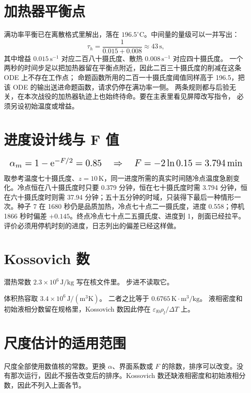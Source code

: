 \section{加热器平衡点}

满功率平衡已在离散格式里解出，落在 \(196.5^\circ\mathrm{C}\)。中间量的量级可以一并写出：
\begin{equation}
\label{eq:heater-tau}
\tau_h=\frac{1}{0.015+0.008}\approx 43\,\mathrm{s},
\end{equation}
其中增益 \(0.015\,\mathrm{s}^{-1}\) 对应二百八十摄氏度、散热 \(0.008\,\mathrm{s}^{-1}\) 对应四十摄氏度。
一个两秒的时间步足以把加热器留在平衡点附近，因此二百三十摄氏度的削减在这条 ODE 上不存在工作点；
命题函数所用的二百一十摄氏度阈值同样高于 196.5，把该 ODE 的输出送进命题函数，请求仍停在满功率一侧。
两条规则都与后验无关，在本次战役的加热器轨迹上也始终待命。要在主表里看见屏障改写指令，
必须另设初始温度或增益。

\section{进度设计线与 F 值}

\[
\resizebox{\columnwidth}{!}{$
\alpha_m=1-\mathrm{e}^{-F/2}=0.85
\quad\Rightarrow\quad
F=-2\ln 0.15=3.794\,\mathrm{min}
$}
\]
取参考温度七十摄氏度、\(z=10\,\mathrm{K}\)，同一进度所需的真实时间随冷点温度急剧变化。冷点恒在八十摄氏度时只要 0.379 分钟，恒在七十摄氏度时需 3.794 分钟，恒在六十摄氏度时则需 37.94 分钟；五十五分钟的时域，只装得下最后一种情形一次。种子 7 在 1680 秒仍是品质加热，冷点七十点二一摄氏度，进度 0.558；停机 1866 秒时偏差 \(+0.145\)。终点冷点七十点二五摄氏度、进度到 1，剖面已经拉平。评价必须用停机时刻的进度，日志列出的偏差已经这样做。

\section{Kossovich 数}

潜热常数 \(2.3\times 10^{6}\,\mathrm{J/kg}\) 写在核文件里。
步进不读取它。

体积热容取 \(3.4\times 10^{6}\,\mathrm{J}/(\mathrm{m}^3\mathrm{K})\)。
二者之比等于 \(0.6765\,\mathrm{K}\cdot\mathrm{m}^3/\mathrm{kg}\)。
液相密度和初始液相分数留在规格里，Kossovich 数因此停在 \(\varepsilon_{l0}\rho_l/\Delta T\) 上。

\section{尺度估计的适用范围}
\enlargethispage{4\baselineskip}

尺度全部使用数值核的常数。更换 \(\alpha\)、界面系数或 \(F\) 的除数，排序可以改变。没有那次运行，因此不报告改变后的排序。Kossovich 数还缺液相密度和初始液相分数，因此不列入上面各节。
